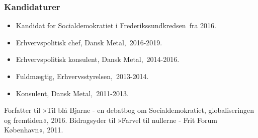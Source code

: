 \documentclass[11pt, a4paper]{awesome-cv}
\begin{document}
\begin{cvletter}
\subsubsection*{Kandidaturer}
\begin{itemize}
\item Kandidat for Socialdemokratiet i Frederikssundkredsen fra 2016.
\end{itemize}
\begin{itemize}
\item Erhvervspolitisk chef, Dansk Metal, 2016-2019.
\item Erhvervspolitisk konsulent, Dansk Metal, 2014-2016.
\item Fuldmægtig, Erhvervsstyrelsen, 2013-2014.
\item Konsulent, Dansk Metal, 2011-2013.
\end{itemize}
Forfatter til »Til blå Bjarne - en debatbog om Socialdemokratiet, globaliseringen og fremtiden«, 2016. Bidragsyder til »Farvel til nullerne - Frit Forum København«, 2011.

\end{cvletter}
\end{document}
